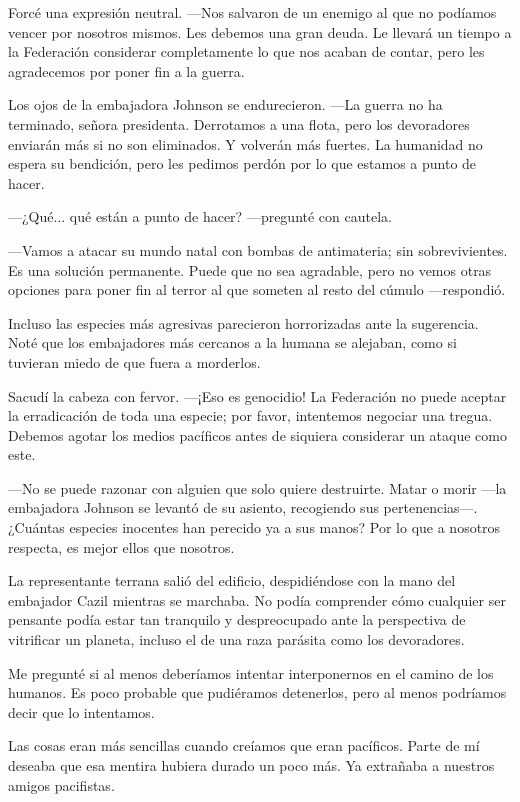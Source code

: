 Forcé una expresión neutral. —Nos salvaron de un enemigo al que no podíamos vencer por nosotros mismos. Les debemos una gran deuda. Le llevará un tiempo a la Federación considerar completamente lo que nos acaban de contar, pero les agradecemos por poner fin a la guerra.

Los ojos de la embajadora Johnson se endurecieron. —La guerra no ha terminado, señora presidenta. Derrotamos a una flota, pero los devoradores enviarán más si no son eliminados. Y volverán más fuertes. La humanidad no espera su bendición, pero les pedimos perdón por lo que estamos a punto de hacer.

 —¿Qué... qué están a punto de hacer? —pregunté con cautela.

—Vamos a atacar su mundo natal con bombas de antimateria; sin sobrevivientes. Es una solución permanente. Puede que no sea agradable, pero no vemos otras opciones para poner fin al terror al que someten al resto del cúmulo —respondió.

Incluso las especies más agresivas parecieron horrorizadas ante la sugerencia. Noté que los embajadores más cercanos a la humana se alejaban, como si tuvieran miedo de que fuera a morderlos.

Sacudí la cabeza con fervor. —¡Eso es genocidio! La Federación no puede aceptar la erradicación de toda una especie; por favor, intentemos negociar una tregua. Debemos agotar los medios pacíficos antes de siquiera considerar un ataque como este.

—No se puede razonar con alguien que solo quiere destruirte. Matar o morir —la embajadora Johnson se levantó de su asiento, recogiendo sus pertenencias—. ¿Cuántas especies inocentes han perecido ya a sus manos? Por lo que a nosotros respecta, es mejor ellos que nosotros.

La representante terrana salió del edificio, despidiéndose con la mano del embajador Cazil mientras se marchaba. No podía comprender cómo cualquier ser pensante podía estar tan tranquilo y despreocupado ante la perspectiva de vitrificar un planeta, incluso el de una raza parásita como los devoradores.

Me pregunté si al menos deberíamos intentar interponernos en el camino de los humanos. Es poco probable que pudiéramos detenerlos, pero al menos podríamos decir que lo intentamos.

Las cosas eran más sencillas cuando creíamos que eran pacíficos. Parte de mí deseaba que esa mentira hubiera durado un poco más. Ya extrañaba a nuestros amigos pacifistas.
